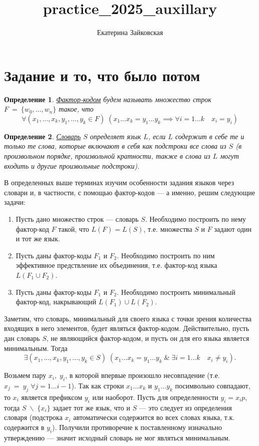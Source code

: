\documentclass[14pt, russian]{scrartcl}
\title{practice\_2025\_auxillary}
\author{Екатерина Зайковская}
\newcounter{cDefinition}
\newtheorem{Definition}{Определение}[cDefinition]
\begin{document}
\section{Задание и то, что было потом}

\begin{Definition}
\label{f-c}
\underline{Фактор-кодом} будем называть множество строк $F~=~\{w_0, ..., w_n\}$ такое, 
что $$ \forall (x_1, ..., x_k, y_1, ..., y_k \in F) \; (x_1...x_k = y_1...y_k \implies \forall i = 1...k \quad x_i = y_i ) $$ 
\end{Definition}

\begin{Definition}
\label{Dict}
    \underline{Словарь} $S$ определяет язык $L$, если $L$ содержит в себе те и только те слова, которые включают в себя как подстроки все слова из $S$ (в произвольном порядке, произвольной кратности, также в слова из $L$ могут входить и другие произвольные подстроки). 
\end{Definition}

В определенных выше терминах изучим особенности задания языков через словари и, в частности, с помощью фактор-кодов --- а именно, решим следующие задачи:

\begin{enumerate}
    \item Пусть дано множество строк --- словарь $S$. Необходимо построить по нему фактор-код $F$ такой, что $L(F) = L(S)$, т.е. множества $S$ и $F$ задают один и тот же язык. 
    \item Пусть даны фактор-коды $F_1$ и $F_2$. Необходимо построить по ним эффективное предствление их объединения, т.е. фактор-код языка $L(F_1 \cup F_2 )$.
    \item Пусть даны фактор-коды $F_1$ и $F_2$. Необходимо построить минимальный фактор-код, накрывающий $L(F_1) \cup L(F_2)$. 
\end{enumerate}


Заметим, что словарь, минимальный для своего языка с точки зрения количества входящих в него элементов, будет являться фактор-кодом. Действительно, пусть дан словарь $S$, не являющийся фактор-кодом, и пусть он для его языка является минимальным. Тогда 
$$ \exists (x_1, ..., x_k, y_1, ..., y_k \in S )\; (x_1...x_k = y_1...y_k \; \& \; \exists i = 1...k \quad x_i \neq y_i). $$

Возьмем пару $x_i, \; y_i$, в которой впервые произошло несовпадение (т.е. $x_j~=~y_j \; \forall j = 1...i-1$). Так как строки $x_1...x_k$ и $y_1...y_k$ посимвольно совпадают, то $x_i$ является префиксом $y_i$ или наоборот. Пусть для определенности $y_i = x_i p$, тогда $S \; \backslash \; \{x_i\}$ задает тот же язык, что и $S$ --- это следует из определения словаря (подстрока $x_i$ автоматически содержится во всех словах языка, т.к. содержится в $y_i$). Получили противоречие к поставленному изначально утверждению --- значит исходный словарь не мог являться минимальным.
\end{document}
